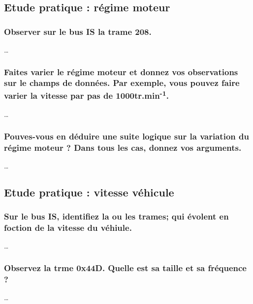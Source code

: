 \documentclass{rapportECC}
\begin{document}
\subsection{Etude pratique : régime moteur}

\subsubsection*{Observer sur le bus IS la trame 208.}

\dots

\subsubsection*{Faites varier le régime moteur et donnez vos observations sur le champs de données. Par exemple, vous pouvez faire varier la vitesse par pas de 1000tr.min\textsuperscript{-1}.}

\dots

\subsubsection*{Pouves-vous en déduire une suite logique sur la variation du régime moteur ? Dans tous les cas, donnez vos arguments.}

\dots


\subsection{Etude pratique : vitesse véhicule}

\subsubsection*{Sur le bus IS, identifiez la ou les trames; qui évolent en foction de la vitesse du véhiule.}

\dots

\subsubsection*{Observez la trme 0x44D. Quelle est sa taille et sa fréquence ?}

\dots
\end{document}
